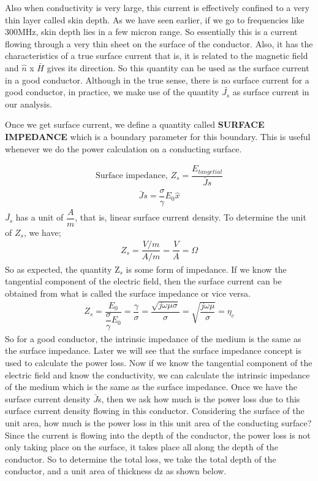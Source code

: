 Also when conductivity is very large, this current is effectively confined to a very thin layer called skin depth. As we have seen earlier, if we go to frequencies like 300MHz, skin depth lies in a few micron range. So essentially this is a current flowing through a very thin sheet on the surface of the conductor. Also, it has the characteristics of a true surface current that is, it is related to the magnetic field and $\hat{n}$ x $\bar{H}$ gives its direction. So this quantity can be used as the surface current in a good conductor. Although in the true sense, there is no surface current for a good conductor, in practice, we make use of the quantity $\bar{J_{s}}$ as surface current in our analysis.

Once we get surface current, we define a quantity called \textbf{SURFACE IMPEDANCE} which is a boundary parameter for this boundary. This is useful whenever we do the power calculation on a conducting surface.

\begin{align}
\text{Surface impedance, }Z_{s}=\dfrac{E_{tangetial}}{\bar{J}s}
\end{align}
\begin{align}
\bar{J}s=\dfrac{\sigma}{\gamma}E_0\hat{x}
\end{align}
$\bar{J_{s}}$ has a unit of $\dfrac{A}{m}$, that is, linear surface current density.
To determine the unit of $Z_{s}$, we have;
\begin{align}
Z_{s}=\dfrac{V/m}{A/m}=\dfrac{V}{A}=\Omega
\end{align}
So as expected, the quantity Z$_{s}$ is some form of impedance. If we know the tangential component of the electric field, then the surface current can be obtained from what is called the surface impedance or vice versa.
\begin{align}
Z_{s}=\dfrac{E_0}{\dfrac{\sigma}{\gamma} E_0}=\dfrac{\gamma}{\sigma}=\dfrac{\sqrt{j\omega\mu\sigma}}{\sigma}=\sqrt{\dfrac{j\omega\mu}{\sigma}}=\eta_{c}
\end{align}
So for a good conductor, the intrinsic impedance of the medium is the same as the surface impedance. Later we will see that the surface impedance concept is used to calculate the power loss. Now if we know the tangential component of the electric field and know the conductivity, we can calculate the intrinsic impedance of the medium which is the same as the surface impedance.
Once we have the surface current density $\bar{J}$s, then we ask how much is the power loss due to this surface current density flowing in this conductor. Considering the surface of the unit area, how much is the power loss in this unit area of the conducting surface? Since the current is flowing into the depth of the conductor, the power loss is not only taking place on the surface, it takes place all along the depth of the conductor. So to determine the total loss, we take the total depth of the conductor, and a unit area of thickness dz as shown below.

